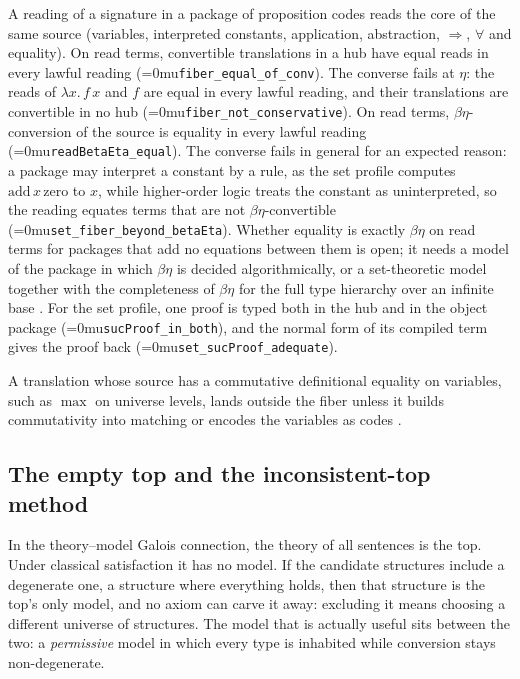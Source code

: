 \documentclass[11pt]{article}
\newcommand{\leanname}[1]{\textup{\Urlmuskip=0mu\relax\nolinkurl{#1}}}
\theoremstyle{definition}
\theoremstyle{remark}
\begin{document}
A reading of a signature in a package of proposition codes reads the core of
the same source (variables, interpreted constants, application, abstraction,
$\Rightarrow$, $\forall$ and equality). On read terms, convertible
translations in a hub have equal reads in every lawful reading
(\leanname{fiber_equal_of_conv}). The converse fails at $\eta$: the reads of
$\lambda x.\,f\,x$ and $f$ are equal in every lawful reading, and their
translations are convertible in no hub (\leanname{fiber_not_conservative}).
On read terms, $\beta\eta$-conversion of the source is equality in every lawful
reading (\leanname{readBetaEta_equal}). The converse fails in general for an
expected reason: a package may interpret a constant by a rule, as the set
profile computes $\mathrm{add}\,x\,\mathrm{zero}$ to $x$, while higher-order
logic treats the constant as uninterpreted, so the reading equates terms that
are not $\beta\eta$-convertible (\leanname{set_fiber_beyond_betaEta}). Whether
equality is exactly $\beta\eta$ on read terms for packages that add no
equations between them is open; it needs a model of the package in which
$\beta\eta$ is decided algorithmically, or a set-theoretic model together with
the completeness of $\beta\eta$ for the full type hierarchy over an infinite
base \cite{FriedmanEqualityFunctionals}. For the set profile, one proof is
typed both in the hub and in the object package
(\leanname{sucProof_in_both}), and the normal form of its compiled term gives
the proof back (\leanname{set_sucProof_adequate}).

A translation whose source has a
commutative definitional equality on variables, such as $\max$ on universe
levels, lands outside the fiber unless it builds commutativity into matching or
encodes the variables as codes \cite{GenestierAgda,BlanquiVaishnavLean}.

\subsection{The empty top and the inconsistent-top method}

In the theory--model Galois connection, the theory of all sentences is the
top. Under classical satisfaction it has no model. If the candidate structures
include a degenerate one, a structure where everything holds, then that
structure is the top's only model, and no axiom can carve it away: excluding it
means choosing a different universe of structures. The model that is actually
useful sits between the two: a \emph{permissive} model in which every type is
inhabited while conversion stays non-degenerate.
\end{document}
